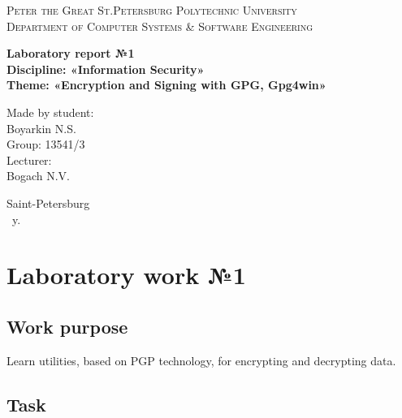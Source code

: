 \documentclass[14pt,a4paper,report]{report}
\begin{document}
\def\contentsname{Contents}

\begin{titlepage}
	\begin{center}
		\textsc{Peter the Great St.Petersburg Polytechnic University\\[5mm]
			Department of Computer Systems \& Software Engineering}
		
		\vfill
		
		\textbf{Laboratory report №1\\[3mm]
			Discipline: «Information Security»\\[3mm]
			Theme: «Encryption and Signing with GPG, Gpg4win»\\[41mm]
		}
	\end{center}
	
	\hfill
	\begin{minipage}{.4\textwidth}
		Made by student:\\[2mm] 
		Boyarkin N.S.\\
		Group: 13541/3\\[5mm]
		
		Lecturer:\\[2mm] 
		Bogach N.V.
	\end{minipage}
	\vfill
	\begin{center}
		Saint-Petersburg\\ \the\year\ y.
	\end{center}
\end{titlepage}

\tableofcontents
\clearpage

\chapter{Laboratory work №1}

\section{Work purpose}

Learn utilities, based on PGP technology, for encrypting and decrypting data.

\section{Task}
\end{document}
